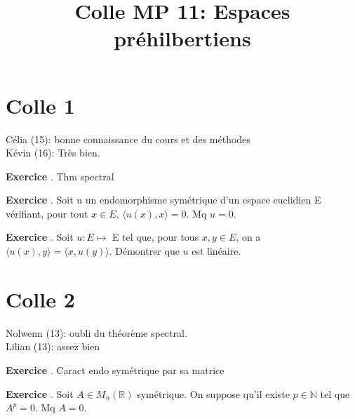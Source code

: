 \documentclass[10pt,a4paper]{article}
\title{Colle MP 11: Espaces préhilbertiens}
\newcounter{question}
\newcounter{exo}
\newenvironment{exo}{\vspace{0.5cm}\setcounter{question}{0}\addtocounter{exo}{1} \noindent \textbf{Exercice \theexo}. \normalsize }{\par}
\begin{document}
	\maketitle
	
	\section*{Colle 1}
	Célia (15): bonne connaissance du cours et des méthodes \\
	Kévin (16): Très bien.\\	

	
	\begin{exo}
		Thm spectral
	\end{exo}

	\begin{exo}
		Soit u un endomorphisme symétrique d'un espace euclidien E vérifiant, pour tout $x \in E$, $⟨u(x),x⟩=0$. Mq $u = 0$.
	\end{exo}

	\begin{exo}
		Soit $u:E \longmapsto$ E tel que, pour tous $x,y \in E$, on a $⟨u(x),y⟩=⟨x,u(y)⟩$. Démontrer que $u$ est linéaire.

	\end{exo}
		
	\section*{Colle 2}
	\setcounter{exo}{0}
	Nolwenn (13): oubli du théorème spectral.\\
	Lilian (13): assez bien

	\begin{exo}
		Caract endo symétrique par sa matrice
	\end{exo}

%	

	\begin{exo}
		Soit $A \in M_n(\mathbb{R})$ symétrique. On suppose qu'il existe $p \in \mathbb{N}$ tel que $A^p=0$. Mq $A = 0$.
	\end{exo}
\end{document}
